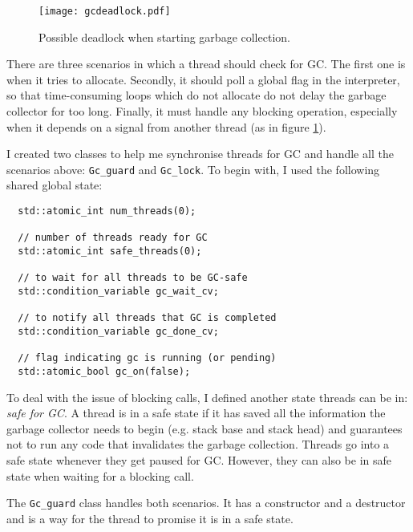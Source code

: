 \begin{figure}[H]
  \centering
  \texttt{[image: gcdeadlock.pdf]}
  \caption{Possible deadlock when starting garbage collection.}
  \label{fig:gcdeadlock}
\end{figure}

There are three scenarios in which a thread should check for GC. The first one is when it tries to allocate.
Secondly, it should poll a global flag in the interpreter, so that time-consuming loops which do not allocate do not
delay the garbage collector for too long. Finally, it must handle any blocking operation, especially
when it depends on a signal from another thread (as in figure \ref{fig:gcdeadlock}).

I created two classes to help me synchronise threads for GC and handle all the scenarios above:
\verb|Gc_guard| and \verb|Gc_lock|.
To begin with, I used the following shared global state:
\begin{code}
\begin{verbatim}
  std::atomic_int num_threads(0);

  // number of threads ready for GC
  std::atomic_int safe_threads(0);

  // to wait for all threads to be GC-safe
  std::condition_variable gc_wait_cv;

  // to notify all threads that GC is completed
  std::condition_variable gc_done_cv;

  // flag indicating gc is running (or pending)
  std::atomic_bool gc_on(false);
\end{verbatim}
\end{code}

To deal with the issue of blocking calls, I defined another state threads can be in: \emph{safe for GC}. A thread
is in a safe state if it has saved all the information the garbage collector needs to begin (e.g. stack base
and stack head) and guarantees not to run any code that invalidates the garbage collection. Threads go into a safe
state whenever they get paused for GC. However, they can also be in safe state when waiting for a blocking call.

The \verb|Gc_guard| class handles both scenarios.
It has a constructor and a destructor and is a way for the thread to promise it is in a safe state.

